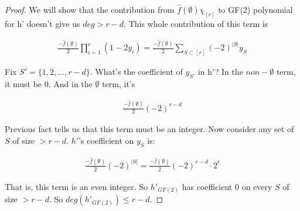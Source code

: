 \documentclass[12pt]{article}
\begin{document}
\begin{proof}
We will show that the contribution from $\hat {f}(\emptyset)
\chi_{[r]}$ to GF(2) polynomial for h' doesn't give us $deg >
r-d$. This whole contribution of this term is

\begin{eqnarray*}
\frac {- \hat{f}(\emptyset)}{2} \prod^r_{i=1} {(1 - 2y_i)}
= \frac {- \hat{f}(\emptyset)}{2} \sum_{S \subset [r]} (-2)^{|S|}y_S
\end{eqnarray*}

Fix $S' = \{ 1, 2,..., r-d\}$. What's the coefficient of $y_{S'}$ in
h'? In the $non-\emptyset$ term, it must be 0. And in the $\emptyset$
term, it's

\begin{eqnarray*}
\frac {- \hat{f}(\emptyset)}{2} (-2)^{r-d}
\end{eqnarray*}

Previous fact tells us that this term must be an integer. Now consider
any set of $S$ of size $> r - d$. $h'$'s coefficient on $y_S$ is:

\begin{eqnarray*}
\frac {- \hat{f}(\emptyset)}{2} (-2)^{|S|} = \frac {-
  \hat{f}(\emptyset)}{2} (-2)^{r-d} \cdot 2^t 
\end{eqnarray*}

That is, this term is an even integer. So $h'_{GF(2)}$ has
coefficient 0 on every $S$ of size $> r-d$. So $deg(h'_{GF(2)}) \le
r-d$.
\end{proof}
\end{document}
